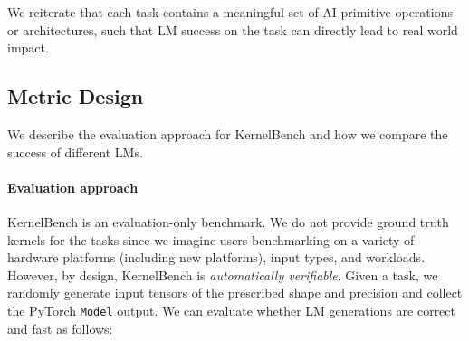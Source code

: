 \begin{itemize}[itemsep=0.1pt,topsep=0pt,leftmargin=*]
\end{itemize}

\noindent We reiterate that each task contains a meaningful set of AI primitive operations or architectures, such that LM success on the task can directly lead to real world impact.   




\subsection{Metric Design} \label{sec-metric-design}

We describe the evaluation approach for KernelBench and how we compare the success of different LMs. 

\paragraph{Evaluation approach}
KernelBench is an evaluation-only benchmark. We do not provide ground truth kernels for the tasks since we imagine users benchmarking on a variety of hardware platforms (including new platforms), input types, and workloads. However, by design, KernelBench is \textit{automatically verifiable}. Given a task, we randomly generate input tensors of the prescribed shape and precision and collect the PyTorch \texttt{Model} output. We can evaluate whether LM generations are correct and fast as follows:

